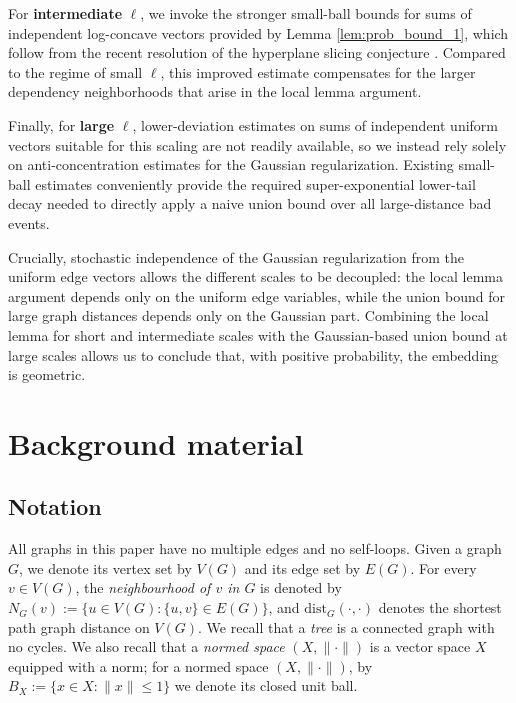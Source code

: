\documentclass[11pt,leqno]{amsart}
\theoremstyle{remark}
\theoremstyle{plain}
\begin{document}
For \textbf{intermediate} $\ell$, we invoke the stronger small-ball bounds  for sums of independent log-concave vectors provided by Lemma \ref{lem:prob_bound_1}, which follow from the recent resolution of the hyperplane slicing conjecture \cite{KL24b}. Compared to the regime of small $\ell$, this improved estimate compensates for the larger dependency neighborhoods that arise in the local lemma argument.

Finally, for \textbf{large} $\ell$, lower-deviation estimates on sums of independent uniform vectors suitable for this scaling are not readily available, so we instead rely solely on anti-concentration estimates for the Gaussian regularization.  Existing small-ball estimates conveniently provide the required super-exponential lower-tail decay needed to directly apply a naive union bound over all large-distance bad events.

Crucially, stochastic independence of the Gaussian regularization from the uniform edge vectors allows the different scales to be decoupled: the local lemma argument depends only on the uniform edge variables, while the union bound for large graph distances depends only on the Gaussian part. Combining the local lemma for short and intermediate scales with the Gaussian-based union bound at large scales allows us to conclude that, with positive probability, the embedding is geometric.

\section{Background material} \label{sec2}

\subsection{Notation}

All graphs in this paper have no multiple edges and no self-loops. Given a graph~$G$, we denote its vertex set by $V(G)$ and its edge set by $E(G)$. For every $v\in V(G)$, the \emph{neighbourhood of $v$ in $G$} is denoted by $N_G(v):= \big\{u\in V(G)\colon \{u,v\}\in E(G)\big\}$, and $\mathrm{dist}_G(\cdot,\cdot)$ denotes the shortest path graph distance on $V(G)$. We recall that a \emph{tree} is a connected graph with no cycles. We also recall that a \emph{normed space} $(X,\|\cdot\|)$ is a vector space $X$ equipped with a norm; for a normed space $(X,\|\cdot\|)$, by $B_X:=\big\{x\in X\colon \|x\|\leqslant 1\big\}$ we denote its closed unit ball.
\end{document}
